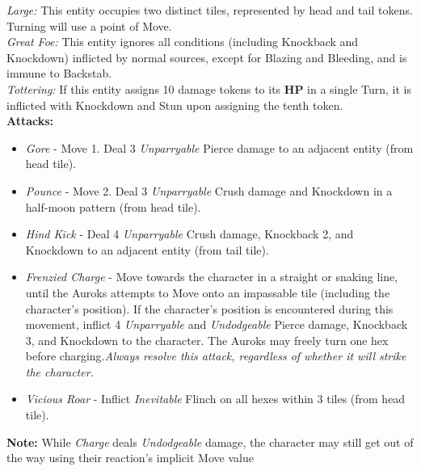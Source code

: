 \emph{Large:} This entity occupies two distinct tiles, represented by head and tail tokens. Turning will use a point of Move.\\

\emph{Great Foe:} This entity ignores all conditions (including Knockback and Knockdown) inflicted by normal sources, except for Blazing and Bleeding, and is immune to Backstab.\\

\emph{Tottering:} If this entity assigns 10 damage tokens to its \textbf{HP} in a single Turn, it is inflicted with Knockdown and Stun upon assigning the tenth token.\\

\textbf{Attacks:}
\begin{itemize}
\item \emph{Gore} -  Move 1. Deal 3 \emph{Unparryable} Pierce damage to an adjacent entity (from head tile).
\item \emph{Pounce} - Move 2. Deal 3 \emph{Unparryable} Crush damage and Knockdown in a half-moon pattern (from head tile).
\item \emph{Hind Kick} - Deal 4 \emph{Unparryable} Crush damage, Knockback 2, and Knockdown to an adjacent entity (from tail tile).
\item \emph{Frenzied Charge} - Move towards the character in a straight or snaking line, until the Auroks attempts to Move onto an impassable tile (including the character’s position). If the character’s position is encountered during this movement, inflict 4 \emph{Unparryable} and \emph{Undodgeable} Pierce damage, Knockback 3, and Knockdown to the character. The Auroks may freely turn one hex before charging.\newline \emph{Always resolve this attack, regardless of whether it will strike the character.}
\item \emph{Vicious Roar} - Inflict \emph{Inevitable} Flinch on all hexes within 3 tiles (from head tile).
\end{itemize}

\begin{tcolorbox}
\textbf{Note:} While \emph{Charge} deals \emph{Undodgeable} damage, the character may still get out of the way using their reaction’s implicit Move value
\end{tcolorbox}

\pagebreak

